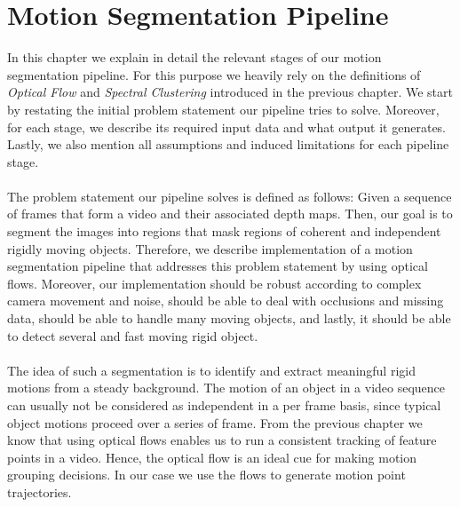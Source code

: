 \chapter{Motion Segmentation Pipeline}
In this chapter we explain in detail the relevant stages of our motion segmentation pipeline. For this purpose we heavily rely on the definitions of \textit{Optical Flow} and \textit{Spectral Clustering} introduced in the previous chapter. We start by restating the initial problem statement our pipeline tries to solve. Moreover, for each stage, we describe its required input data and what output it generates. Lastly, we also mention all assumptions and induced limitations for each pipeline stage. \\ \\
The problem statement our pipeline solves is defined as follows: Given a sequence of frames that form a video and their associated depth maps. Then, our goal is to segment the images into regions that mask regions of coherent and independent rigidly moving objects. Therefore, we describe implementation of a motion segmentation pipeline that addresses this problem statement by using optical flows. Moreover, our implementation should be robust according to complex camera movement and noise, should be able to deal with occlusions and missing data, should be able to handle many moving objects, and lastly, it should be able to detect several and fast moving rigid object. \\ \\
The idea of such a segmentation is to identify and extract meaningful rigid motions from a steady background. The motion of an object in a video sequence can usually not be considered as independent in a per frame basis, since typical object motions proceed over a series of frame. From the previous chapter we know that using optical flows enables us to run a consistent tracking of feature points in a video. Hence, the optical flow is an ideal cue for making motion grouping decisions. In our case we use the flows to generate motion point trajectories.
